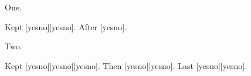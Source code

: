 \documentclass{article}
\def\state#1{[\ifdefined#1yes\else no\fi]}
\begin{document}
\begin{flushleft}\def\envval{}\begingroup\def\innerval{}One.\par\end{flushleft}Kept \state\envval\state\innerval.\endgroup
After \state\envval.

\begin{center}\def\envtwo{}\begingroup\def\outertwo{}\begingroup\def\innertwo{}Two.\par\end{center}Kept \state\envtwo\state\outertwo\state\innertwo.\endgroup
Then \state\envtwo\state\outertwo.\endgroup
Last \state\envtwo\state\outertwo.
\end{document}
